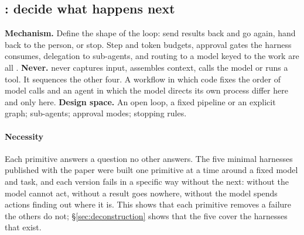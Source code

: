 \subsection{: decide what happens next}
\textbf{Mechanism.} Define the shape of the loop: send results back and go again, hand back to the person, or stop. Step and token budgets, approval gates the harness consumes, delegation to sub-agents, and routing to a model keyed to the work are all .
\textbf{Never.}  never captures input, assembles context, calls the model or runs a tool. It sequences the other four. A workflow in which code fixes the order of model calls \cite{anthropic2024effective} and an agent in which the model directs its own process differ here and only here.
\textbf{Design space.} An open loop, a fixed pipeline or an explicit graph; sub-agents; approval modes; stopping rules.

\paragraph{Necessity} Each primitive answers a question no other answers. The five minimal harnesses published with the paper were built one primitive at a time around a fixed model and task, and each version fails in a specific way without the next: without  the model cannot act, without  a result goes nowhere, without  the model spends actions finding out where it is. This shows that each primitive removes a failure the others do not; \S\ref{sec:deconstruction} shows that the five cover the harnesses that exist.

